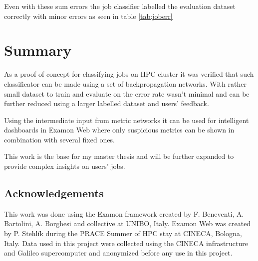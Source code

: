 \documentclass[11pt,a4paper]{article}
\begin{document}
Even with these sum errors the job classifier labelled the evaluation dataset correctly with minor errors as seen in table \ref{tab:joberr}

\section{Summary}
\label{sec:sum}

As a proof of concept for classifying jobs on HPC cluster it was verified that such classificator can be made using a set of backpropagation networks. With rather small dataset to train and evaluate on the error rate wasn't minimal and can be further reduced using a larger labelled dataset and users' feedback.

Using the intermediate input from metric networks it can be used for intelligent dashboards in Examon Web where only suspicious metrics can be shown in combination with several fixed ones.

This work is the base for my master thesis and will be further expanded to provide complex insights on users' jobs.

\subsection*{Acknowledgements}
This work was done using the Examon framework created by F. Beneventi, A. Bartolini, A. Borghesi and collective at UNIBO, Italy. Examon Web was created by P. Stehlík during the PRACE Summer of HPC stay at CINECA, Bologna, Italy. Data used in this project were collected using the CINECA infrastructure and Galileo supercomputer and anonymized before any use in this project.

{}

\end{document}
